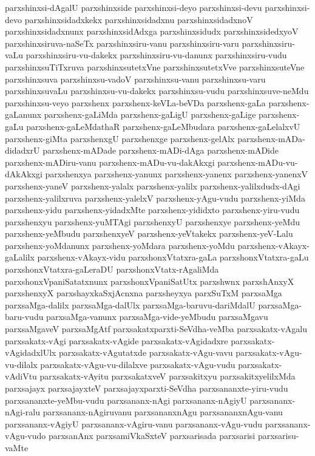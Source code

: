 {parxshinxsi-dAgalU
parxshinxside
parxshinxsi-deyo
parxshinxsi-devu
parxshinxsi-devo
parxshinxsidadxkekx
parxshinxsidadxnu
parxshinxsidadxnoV
parxshinxsidadxnunx
parxshinxsidAdxga
parxshinxsidudx
parxshinxsidedxyoV
parxshinxsiruva-naSeTx
parxshinxsiru-vanu
parxshinxsiru-varu
parxshinxsiru-vaLu
parxshinxsiru-vu-dakekx
parxshinxsiru-vu-danunx
parxshinxsiru-vudu
parxshinxsuTiTxruva
parxshinxsutetxVne
parxshinxsutetxVve
parxshinxsuteVne
parxshinxsuva
parxshinxsu-vadoV
parxshinxsu-vanu
parxshinxsu-varu
parxshinxsuvaLu
parxshinxsu-vu-dakekx
parxshinxsu-vudu
parxshinxsuve-neMdu
parxshinxsu-veyo
parxshenx
parxshenx-keVLa-beVDa
parxshenx-gaLa
parxshenx-gaLanunx
parxshenx-gaLiMda
parxshenx-gaLigU
parxshenx-gaLige
parxshenx-gaLu
parxshenx-gaLeMdathaR
parxshenx-gaLeMbudara
parxshenx-gaLelalxvU
parxshenx-giMta
parxshenxgU
parxshenxge
parxshenx-gelAlx
parxshenx-mADa-didadxrU
parxshenx-mADade
parxshenx-mADi-dAga
parxshenx-mADide
parxshenx-mADiru-vanu
parxshenx-mADu-vu-dakAkxgi
parxshenx-mADu-vu-dAkAkxgi
parxshenxya
parxshenx-yanunx
parxshenx-yanenx
parxshenx-yanenxV
parxshenx-yaneV
parxshenx-yalalx
parxshenx-yalilx
parxshenx-yalilxdudx-dAgi
parxshenx-yalilxruva
parxshenx-yalelxV
parxshenx-yAgu-vudu
parxshenx-yiMda
parxshenx-yidu
parxshenx-yidadxMte
parxshenx-yididxto
parxshenx-yiru-vudu
parxshenxyu
parxshenx-yuMTAgi
parxshenxyU
parxshenxye
parxshenx-yeMdu
parxshenx-yeMbudu
parxshenxyeV
parxshenx-yeVtakekx
parxshenx-yeV-Lalu
parxshenx-yoMdanunx
parxshenx-yoMdara
parxshenx-yoMdu
parxshenx-vAkayx-gaLalilx
parxshenx-vAkayx-vidu
parxshonxVtatxra-gaLa
parxshonxVtatxra-gaLu
parxshonxVtatxra-gaLeraDU
parxshonxVtatx-rAgaliMda
parxshonxVpaniSatatxnunx
parxshonxVpaniSatUtx
parxshwnx
parxshAnxyX
parxshenxyX
parxshayxkaSxjAcnxna
parxsheyxya
parxSuTxM
parxsaMga
parxsaMga-dalilx
parxsaMga-dalUlx
parxsaMga-baruvu-dariMdalU
parxsaMga-baru-vudu
parxsaMga-vanunx
parxsaMga-vide-yeMbudu
parxsaMgavu
parxsaMgaveV
parxsaMgAtf
parxsakatxparxti-SeVdha-veMba
parxsakatx-vAgalu
parxsakatx-vAgi
parxsakatx-vAgide
parxsakatx-vAgidadxre
parxsakatx-vAgidadxlUlx
parxsakatx-vAgutatxde
parxsakatx-vAgu-vavu
parxsakatx-vAgu-vu-dilalx
parxsakatx-vAgu-vu-dilalxve
parxsakatx-vAgu-vudu
parxsakatx-vAdiVtu
parxsakatx-vAyitu
parxsakatxveV
parxsakitxyu
parxsakitxyelilxMda
parxsajayx
parxsajayxteV
parxsajayxparxti-SeVdha
parxsananxte-yiru-vudu
parxsananxte-yeMbu-vudu
parxsananx-nAgi
parxsananx-nAgiyU
parxsananx-nAgi-ralu
parxsananx-nAgiruvanu
parxsananxnAgu
parxsananxnAgu-vanu
parxsananx-vAgiyU
parxsananx-vAgiru-vanu
parxsananx-vAgu-vudu
parxsananx-vAgu-vudo
parxsanAnx
parxsamiVkaSxteV
parxsarisada
parxsarisi
parxsarisu-vaMte
}
